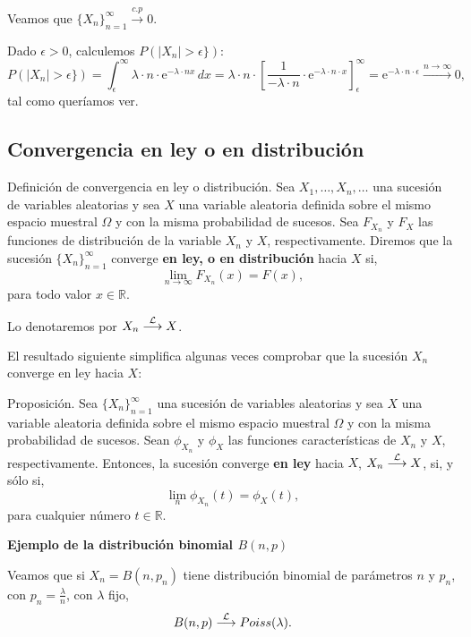 \documentclass[
  letterpaper,
  DIV=11,
  numbers=noendperiod]{scrreprt}
\begin{document}
Veamos que \(\{X_n\}_{n=1}^\infty\stackrel{c.p}{\longrightarrow} 0\).

Dado \(\epsilon >0\), calculemos \(P(|X_n|>\epsilon \})\): \[
P(|X_n|>\epsilon \}) = \int_\epsilon^\infty \lambda\cdot  n\cdot \mathrm{e}^{-\lambda\cdot  n x}\, dx =\lambda\cdot  n\cdot  \left[\frac{1}{-\lambda \cdot n}\cdot\mathrm{e}^{-\lambda\cdot  n\cdot  x}\right]_\epsilon^\infty =\mathrm{e}^{-\lambda\cdot  n\cdot  \epsilon}\stackrel{n\to\infty}{\longrightarrow} 0,
\] tal como queríamos ver.

\hypertarget{convergencia-en-ley-o-en-distribuciuxf3n}{%
\subsection{Convergencia en ley o en
distribución}\label{convergencia-en-ley-o-en-distribuciuxf3n}}

Definición de convergencia en ley o distribución. Sea
\(X_1,\ldots,X_n,\ldots\) una sucesión de variables aleatorias y sea
\(X\) una variable aleatoria definida sobre el mismo espacio muestral
\(\Omega\) y con la misma probabilidad de sucesos. Sea \(F_{X_n}\) y
\(F_X\) las funciones de distribución de la variable \(X_n\) y \(X\),
respectivamente. Diremos que la sucesión \(\{X_n\}_{n=1}^\infty\)
converge \textbf{en ley, o en distribución} hacia \(X\) si, \[
\lim_{n\to\infty} F_{X_n}(x)=F(x),
\] para todo valor \(x\in\mathbb{R}\).

Lo denotaremos por \(X_n\stackrel{{\cal L}}{\longrightarrow}X\).

El resultado siguiente simplifica algunas veces comprobar que la
sucesión \(X_n\) converge en ley hacia \(X\):

Proposición. Sea \(\{X_n\}_{n=1}^\infty\) una sucesión de variables
aleatorias y sea \(X\) una variable aleatoria definida sobre el mismo
espacio muestral \(\Omega\) y con la misma probabilidad de sucesos. Sean
\(\phi_{X_n}\) y \(\phi_X\) las funciones características de \(X_n\) y
\(X\), respectivamente. Entonces, la sucesión converge \textbf{en ley}
hacia \(X\), \(X_n\stackrel{{\cal L}}{\longrightarrow}X\), si, y sólo
si, \[
\lim_{n} \phi_{X_n}(t) = \phi_X(t),
\] para cualquier número \(t\in\mathbb{R}\).

\textbf{Ejemplo de la distribución binomial \(B(n,p)\)}

Veamos que si \(X_n=B(n,p_n)\) tiene distribución binomial de parámetros
\(n\) y \(p_n\), con \(p_n=\frac{\lambda}{n}\), con \(\lambda\) fijo, \[
B(n,p)\stackrel{{\cal L}}{\longrightarrow}Poiss(\lambda).
\]
\end{document}
